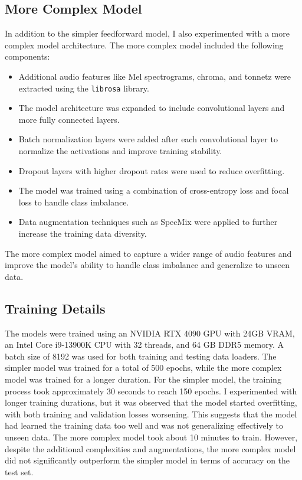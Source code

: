 \documentclass{article}
\begin{document}
\subsection{More Complex Model}
In addition to the simpler feedforward model, I also experimented with a more complex model architecture. The more complex model included the following components:
\begin{itemize}
    \item Additional audio features like Mel spectrograms, chroma, and tonnetz were extracted using the \texttt{librosa} library.
    \item The model architecture was expanded to include convolutional layers and more fully connected layers.
    \item Batch normalization layers were added after each convolutional layer to normalize the activations and improve training stability.
    \item Dropout layers with higher dropout rates were used to reduce overfitting.
    \item The model was trained using a combination of cross-entropy loss and focal loss to handle class imbalance.
    \item Data augmentation techniques such as SpecMix were applied to further increase the training data diversity.
\end{itemize}
The more complex model aimed to capture a wider range of audio features and improve the model's ability to handle class imbalance and generalize to unseen data.
\subsection{Training Details}
The models were trained using an NVIDIA RTX 4090 GPU with 24GB VRAM, an Intel Core i9-13900K CPU with 32 threads, and 64 GB DDR5 memory. A batch size of 8192 was used for both training and testing data loaders. The simpler model was trained for a total of 500 epochs, while the more complex model was trained for a longer duration.
For the simpler model, the training process took approximately 30 seconds to reach 150 epochs. I experimented with longer training durations, but it was observed that the model started overfitting, with both training and validation losses worsening. This suggests that the model had learned the training data too well and was not generalizing effectively to unseen data.
The more complex model took about 10 minutes to train. However, despite the additional complexities and augmentations, the more complex model did not significantly outperform the simpler model in terms of accuracy on the test set.
\end{document}
